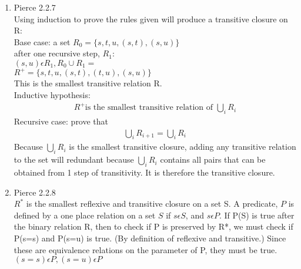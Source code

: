 \documentclass[]{article}
\begin{document}
\begin{flushleft}
\begin{enumerate}
\item Pierce 2.2.7\\
Using induction to prove the rules given will produce a transitive closure on R:\\
Base case: a set $R_0 = \{s,t,u,(s,t),(s,u)\}$\\
after one recursive step, $R_1$:\\
$(s,u) \epsilon R_1, R_0 \cup R_1 = $\\
$R^{+} = \{s,t,u,(s,t),(t,u),(s,u)\}$\\
This is the smallest transitive relation R.\\
Inductive hypothesis:
\begin{align*}
	R^+ \text{is the smallest transitive relation of } \bigcup_{i}{R_i}
\end{align*}
Recursive case: prove that
\begin{align*}
	\bigcup_{i}{R_{i+1}} = \bigcup_{i}{R_i}
\end{align*}
Because $\bigcup_{i}{R_i}$ is the smallest transitive closure, adding any transitive relation to the set will redundant because $\bigcup_{i}{R_i}$ contains all pairs that can be obtained from 1 step of transitivity. It is therefore the transitive closure.

\item Pierce 2.2.8\\
$R^*$ is the smallest reflexive and transitive closure on a set S. A predicate, $P$ is defined by a one place relation on a set $S$ if $s \epsilon S$, and $s \epsilon P$. If P(S) is true after the binary relation R, then to check if P is preserved by R*, we must check if P(s=s) and P(s=u) is true. (By definition of reflexive and transitive.) Since these are equivalence relations on the parameter of P, they must be true. $(s=s)\epsilon P, (s=u)\epsilon P$
\end{enumerate}
\end{flushleft}
\end{document}
